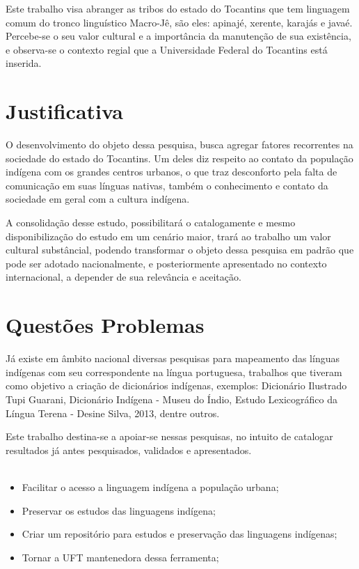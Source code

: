 \documentclass[journal]{IEEEtran}
\begin{document}
Este trabalho visa abranger as tribos do estado do Tocantins que tem linguagem comum do tronco linguístico Macro-Jê, são eles: apinajé, xerente, karajás e javaé. Percebe-se o seu valor cultural e a importância da manutenção de sua existência, e observa-se o contexto regial que a Universidade Federal do Tocantins está inserida.

\section{Justificativa}

O desenvolvimento do objeto dessa pesquisa, busca agregar fatores recorrentes na sociedade do estado do Tocantins. Um deles diz respeito ao contato da população indígena com os grandes centros urbanos, o que traz desconforto pela falta de comunicação em suas línguas nativas, também o conhecimento e contato da sociedade em geral com a cultura indígena.

A consolidação desse estudo, possibilitará o catalogamente e mesmo disponibilização do estudo em um cenário maior, trará ao trabalho um valor cultural substâncial, podendo transformar o objeto dessa pesquisa em padrão que pode ser adotado nacionalmente, e posteriormente apresentado no contexto internacional, a depender de sua relevância e aceitação.

\section{Questões Problemas}



Já existe em âmbito nacional diversas pesquisas para mapeamento das línguas indígenas com seu correspondente na língua portuguesa, trabalhos que tiveram como objetivo a criação de dicionários indígenas, exemplos: Dicionário Ilustrado Tupi Guarani, Dicionário Indígena - Museu do Índio, Estudo Lexicográfico da Língua Terena - Desine Silva, 2013, dentre outros.

Este trabalho destina-se a apoiar-se nessas pesquisas, no intuito de catalogar resultados já antes pesquisados, validados e apresentados.
\\
\\

\begin{itemize}
    \item Facilitar o acesso a linguagem indígena a população urbana;
    \item Preservar os estudos das linguagens indígena;
    \item Criar um repositório para estudos e preservação das linguagens indígenas;
    \item Tornar a UFT mantenedora dessa ferramenta;
\end{itemize}
\end{document}
